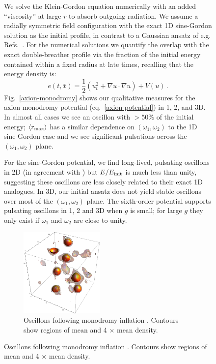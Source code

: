 \documentclass[%
reprint,
superscriptaddress,
amsmath,amssymb,
aps,
prd,
floatfix,
nofootinbib
]{revtex4-1}
\begin{document}
\begin{figure}
We solve the Klein-Gordon equation numerically with an added ``viscosity''  at large $r$ to absorb outgoing radiation. We assume a radially symmetric field configuration with the exact 1D sine-Gordon solution as the initial profile, in contrast to  a Gaussian ansatz of e.g. Refs.~\cite{Hindmarsh:2006ur,Gleiser:2008ty,Gleiser:2009ys,Salmi:2012ta}.  For the numerical solutions we quantify the overlap with the exact double-breather profile via the fraction of the initial  energy contained within a fixed radius at late times, recalling that the energy density is:
%
\begin{equation}
  e(t,\bar{x}) = \frac{1}{2}\left(u_t^2+ \nabla u\cdot\nabla u \right) + V(u) \, .
\end{equation}
%
Fig.~\ref{axion-monodromy} shows our qualitative measures for the axion monodromy potential (eq.~\ref{axion-potential}) in 1, 2, and 3D. In almost all cases we see an oscillon with $>50\%$ of the initial energy; $\langle r_{\rm max}\rangle$ has a similar dependence on $(\omega_1,\omega_2)$ to the 1D sine-Gordon case and we see significant pulsations across the $(\omega_1,\omega_2)$ plane.

For the sine-Gordon potential, we find long-lived, pulsating oscillons in 2D (in agreement with  \cite{Hindmarsh:2006ur}) but $E/E_{\rm init}$ is much less than unity, suggesting these oscillons are  less closely related to their exact 1D analogues. In 3D, our initial ansatz does not yield stable oscillons over most of the $(\omega_1,\omega_2)$ plane. The sixth-order potential  supports pulsating oscillons  in 1, 2 and 3D when $g$ is small; for large $g$ they only exist if  $\omega_1$ and $\omega_2$ are close to unity. 

\begin{figure}
  \centering
  \includegraphics[width=0.45\textwidth]{plot/3dRE.png}
  \caption{Oscillons following monodromy inflation  \cite{Easther:2010qz}. Contours show regions of mean and 4 $\times$ mean density. }\label{oscillons}
\end{figure}


\end{figure}
\end{document}
